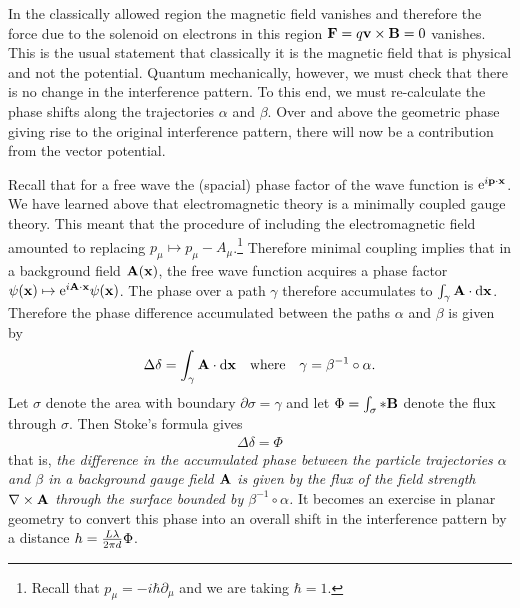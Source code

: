 \documentclass[12pt]{article}
\begin{document}
In the classically allowed region the magnetic field vanishes and therefore the force due to the solenoid on electrons in this region ${\bf F}=q {\bf v} \times {\bf B}=0$ vanishes. This is the usual statement that classically it is the magnetic field that is physical and not the potential. Quantum mechanically, however, we must check that there is no change in the interference pattern. To this end, we must re-calculate the phase shifts along the trajectories $\alpha$ and $\beta$. 
Over and above the geometric phase giving rise to the original interference pattern, there will now be a contribution from the vector potential. 

Recall that for a free wave the (spacial) phase factor of the wave function is ${\rm e}^{i {\bf p}\cdot {\bf x}}$. We have learned above that electromagnetic theory is a minimally coupled gauge theory. This meant that the procedure of including the electromagnetic field amounted to replacing $p_\mu \mapsto p_\mu-A_\mu$.\footnote{Recall that $p_\mu =-i \hbar  \partial_\mu$ and we are taking $\hbar=1$.} Therefore minimal coupling implies that in a background field ${\bf A}({\bf x})$, the free wave function acquires a phase factor $\psi({\bf x}) \mapsto {\rm e}^{i {\bf A}\cdot {\bf x}} \psi({\bf x})$. The phase over a path $\gamma$ therefore accumulates to $\int_\gamma {\bf A} \cdot {\rm d}{\bf x}$. Therefore the phase difference accumulated between the paths $\alpha$ and $\beta$ is given by 
\begin{eqnarray}
\label{pd}
\Delta \delta = \int_\gamma {\bf A}\cdot {\rm d} {\bf x}~~~{\rm where}~~~ \gamma=\beta^{-1} \circ \alpha.
\end{eqnarray}
Let $\sigma$ denote the area with boundary $\partial \sigma = \gamma$ and let $\Phi=\int_\sigma *{\bf B} $ denote the flux through $\sigma$. Then Stoke's formula gives
\begin{eqnarray}
\Delta \delta = \Phi
\end{eqnarray}
that is, {\em the difference in the accumulated phase between the particle trajectories $\alpha$ and $\beta$ in a background gauge field ${\bf A}$ is given by the flux of the field strength $\nabla \times {\bf A}$ through the surface bounded by $\beta^{-1}\circ \alpha$. } It becomes an exercise in planar geometry to convert this phase into an overall shift in the interference pattern by a distance $h={ L \lambda \over 2 \pi d} \Phi$.
\end{document}
